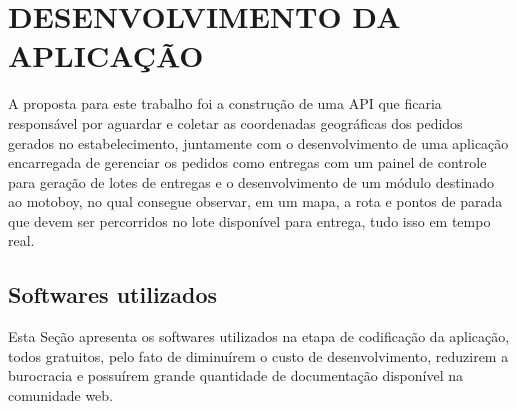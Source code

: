 
\chapter{DESENVOLVIMENTO DA APLICAÇÃO}
A proposta para este trabalho foi a construção de uma API que ficaria responsável
por aguardar e coletar as coordenadas geográficas dos pedidos gerados no estabelecimento,
juntamente com o desenvolvimento de uma aplicação encarregada de gerenciar os pedidos como entregas
com um painel de controle para geração de lotes de entregas e o desenvolvimento de um módulo destinado ao motoboy, no qual consegue observar, em um mapa, a rota e pontos de parada que devem ser percorridos no lote disponível para entrega, tudo isso em tempo real.

\section{Softwares utilizados}
Esta Seção apresenta os softwares utilizados na etapa de codificação da aplicação, todos gratuitos, pelo fato de diminuírem o custo de desenvolvimento, reduzirem a burocracia e possuírem grande quantidade de documentação disponível na comunidade web.

